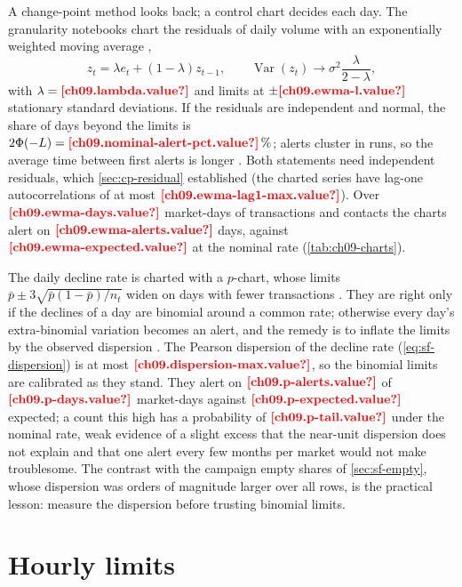 A change-point method looks back; a control chart decides each day. The granularity notebooks chart the residuals of
daily volume with an exponentially weighted moving average \autocite{roberts1959},
\begin{equation}\label{eq:cp-ewma}
  z_t = \lambda e_t + (1 - \lambda) z_{t-1}, \qquad
  \operatorname{Var}(z_t) \to \sigma^2 \frac{\lambda}{2 - \lambda},
\end{equation}
with $\lambda = \est{ch09.lambda}{value}$ and limits at $\pm \est{ch09.ewma-l}{value}$ stationary standard deviations.
If the residuals are independent and normal, the share of days beyond the limits is
$2\Phi(-L) = \est{ch09.nominal-alert-pct}{value}\,\%$; alerts cluster in runs, so the average time between first alerts is
longer \autocite{lucas1990}. Both statements need independent residuals, which \cref{sec:cp-residual} established (the
charted series have lag-one autocorrelations of at most $\est{ch09.ewma-lag1-max}{value}$). Over
$\est{ch09.ewma-days}{value}$ market-days of transactions and contacts the charts alert on $\est{ch09.ewma-alerts}{value}$
days, against $\est{ch09.ewma-expected}{value}$ at the nominal rate (\cref{tab:ch09-charts}).

The daily decline rate is charted with a $p$-chart, whose limits $\bar p \pm 3\sqrt{\bar p (1 - \bar p) / n_t}$ widen on
days with fewer transactions \autocite{montgomery2012}. They are right only if the declines of a day are binomial
around a common rate; otherwise every day's extra-binomial variation becomes an alert, and the remedy is to inflate the
limits by the observed dispersion \autocite{laney2002}. The Pearson dispersion of the decline rate
(\cref{eq:sf-dispersion}) is at most $\est{ch09.dispersion-max}{value}$, so the binomial limits are calibrated as they
stand. They alert on $\est{ch09.p-alerts}{value}$ of $\est{ch09.p-days}{value}$ market-days against
$\est{ch09.p-expected}{value}$ expected; a count this high has a probability of $\est{ch09.p-tail}{value}$ under the nominal
rate, weak evidence of a slight excess that the near-unit dispersion does not explain and that one alert every few
months per market would not make troublesome. The contrast with the
campaign empty shares of \cref{sec:sf-empty}, whose dispersion was orders of magnitude larger over all rows, is the
practical lesson: measure the dispersion before trusting binomial limits.



\section{Hourly limits}\label{sec:cp-hours}

